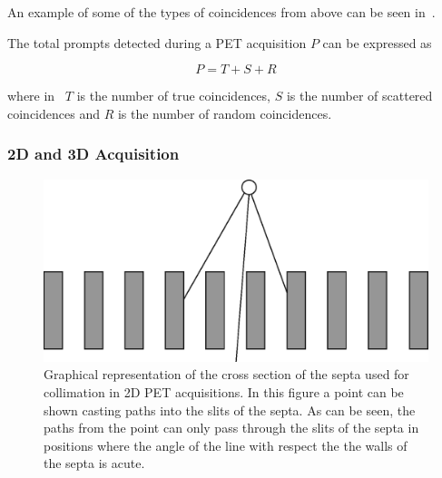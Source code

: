             An example of some of the types of coincidences from above can be seen in~.
            
            The total prompts detected during a \gls{PET} acquisition $P$ can be expressed as
            
            \begin{equation} \label{eq:pet_total_prompts}
                P = T + S + R
            \end{equation}
            
            \noindent where in~ $T$ is the number of true coincidences, $S$ is the number of scattered coincidences and $R$ is the number of random coincidences. %
            
            \subsubsection{2D and 3D Acquisition} \label{sec:2d_and_3d_acquisition}
                \begin{figure}
                    \centering
                    
                    \includegraphics[width=1.0\linewidth]{figures/background_septa.png}
                    
                    \captionsetup{singlelinecheck=false}
                    \caption{
                        Graphical representation of the cross section of the septa used for collimation in \gls{2D} \gls{PET} acquisitions. In this figure a point can be shown casting paths into the slits of the septa. As can be seen, the paths from the point can only pass through the slits of the septa in positions where the angle of the line with respect the the walls of the septa is acute.
                    }
                    \label{fig:2d_and_3d_acquisition_septa}
                \end{figure}
                
